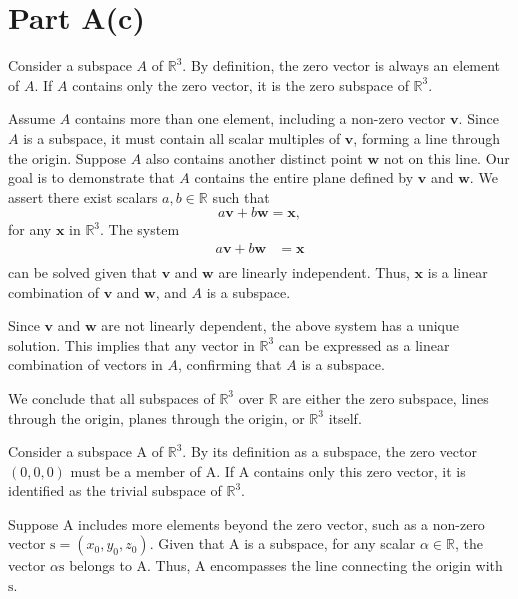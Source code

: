 \documentclass{article}
\begin{document}
\section{Part A(c)}

Consider a subspace \(A\) of \(\mathbb{R}^3\). By definition, the zero vector is always an element of \(A\). If \(A\) contains only the zero vector, it is the zero subspace of \(\mathbb{R}^3\).

Assume \(A\) contains more than one element, including a non-zero vector \(\boldsymbol{v}\). Since \(A\) is a subspace, it must contain all scalar multiples of \(\boldsymbol{v}\), forming a line through the origin. Suppose \(A\) also contains another distinct point \(\boldsymbol{w}\) not on this line. Our goal is to demonstrate that \(A\) contains the entire plane defined by \(\boldsymbol{v}\) and \(\boldsymbol{w}\). We assert there exist scalars \(a, b \in \mathbb{R}\) such that
\[
a\boldsymbol{v} + b\boldsymbol{w} = \boldsymbol{x},
\]
for any \(\boldsymbol{x}\) in \(\mathbb{R}^3\). The system
\[
\begin{aligned}
a\boldsymbol{v} + b\boldsymbol{w} &= \boldsymbol{x} \\
\end{aligned}
\]
can be solved given that \(\boldsymbol{v}\) and \(\boldsymbol{w}\) are linearly independent. Thus, \(\boldsymbol{x}\) is a linear combination of \(\boldsymbol{v}\) and \(\boldsymbol{w}\), and \(A\) is a subspace.

Since \(\boldsymbol{v}\) and \(\boldsymbol{w}\) are not linearly dependent, the above system has a unique solution. This implies that any vector in \(\mathbb{R}^3\) can be expressed as a linear combination of vectors in \(A\), confirming that \(A\) is a subspace.

We conclude that all subspaces of \(\mathbb{R}^3\) over \(\mathbb{R}\) are either the zero subspace, lines through the origin, planes through the origin, or \(\mathbb{R}^3\) itself.

Consider a subspace \(\mathrm{A}\) of \(\mathbb{R}^3\). By its definition as a subspace, the zero vector \((0,0,0)\) must be a member of \(\mathrm{A}\). If \(\mathrm{A}\) contains only this zero vector, it is identified as the trivial subspace of \(\mathbb{R}^3\).

Suppose \(\mathrm{A}\) includes more elements beyond the zero vector, such as a non-zero vector \(\mathrm{s} = (x_0, y_0, z_0)\). Given that \(\mathrm{A}\) is a subspace, for any scalar \(\alpha \in \mathbb{R}\), the vector \(\alpha \mathrm{s}\) belongs to \(\mathrm{A}\). Thus, \(\mathrm{A}\) encompasses the line connecting the origin with \(\mathrm{s}\). 
\end{document}
